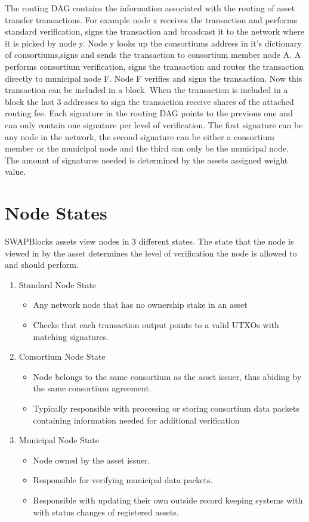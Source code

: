 \documentclass[12pt]{article}
\begin{document}
The routing DAG contains the information associated with the routing of asset 
transfer transactions.  For example node x receives the transaction and performs standard 
verification, signs the transaction and broadcast it to the network where it is picked
by node y. Node y looks up the consortiums address in it's dictionary of 
consortiums,signs and sends the transaction to consortium member node A.  A performs 
consortium verification, signs the transaction and routes the transaction directly to 
municipal node F.  Node F verifies and signs the transaction. 
Now this transaction can be included in a block.  When the 
transaction is included in a block the last 3 addresses to sign the transaction 
receive shares of the attached routing fee.  Each signature in the routing DAG points 
to the previous one and can only contain one signature per level of verification.  
The first signature can be any node in the network, 
the second signature can be either a consortium member or the municipal node 
and the third can only be the municipal node.  The amount of signatures needed 
is determined by the assets assigned weight value. 




\section{Node States}

SWAPBlocks assets view nodes in 3 different states. The state that the node is viewed in 
by the asset determines the level of verification the node is allowed to and should
perform.


\begin{enumerate}
	\item Standard Node State
		\begin{itemize}
			\item{Any network node that has no ownership stake in an asset}
			\item{Checks that each transaction output points to a valid UTXOs
				with matching signatures.}
		\end{itemize}
	\item Consortium Node State
		\begin{itemize}
			\item{Node belongs to the same consortium as the asset issuer,
				thus abiding by the same consortium agreement.}
			\item{Typically responsible with processing  or storing
				consortium data packets containing information 
				needed for additional verification}
		\end{itemize}
	\item Municipal Node State
		\begin{itemize}
			\item{Node owned by the asset issuer.}
			\item{Responsible for verifying municipal data packets.}
			\item{Responsible with updating their own outside record keeping systems with
				with status changes of registered assets.}	
		\end{itemize}
\end{enumerate}
\end{document}
